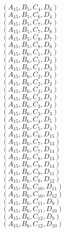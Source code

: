 \documentclass[14pt]{article}
\begin{document}
    $({A}_{15}, {B}_{5}, {C}_{4}, {D}_{6}) $ \\ 
    $({A}_{15}, {B}_{5}, {C}_{6}, {D}_{4}) $ \\ 
    $({A}_{15}, {B}_{5}, {C}_{7}, {D}_{7}) $ \\ 
    $({A}_{15}, {B}_{5}, {C}_{7}, {D}_{8}) $ \\ 
    $({A}_{15}, {B}_{5}, {C}_{8}, {D}_{7}) $ \\ 
    $({A}_{15}, {B}_{5}, {C}_{8}, {D}_{8}) $ \\ 
    $({A}_{15}, {B}_{6}, {C}_{1}, {D}_{1}) $ \\ 
    $({A}_{15}, {B}_{6}, {C}_{1}, {D}_{2}) $ \\ 
    $({A}_{15}, {B}_{6}, {C}_{1}, {D}_{3}) $ \\ 
    $({A}_{15}, {B}_{6}, {C}_{2}, {D}_{1}) $ \\ 
    $({A}_{15}, {B}_{6}, {C}_{2}, {D}_{2}) $ \\ 
    $({A}_{15}, {B}_{6}, {C}_{2}, {D}_{3}) $ \\ 
    $({A}_{15}, {B}_{6}, {C}_{3}, {D}_{1}) $ \\ 
    $({A}_{15}, {B}_{6}, {C}_{3}, {D}_{2}) $ \\ 
    $({A}_{15}, {B}_{6}, {C}_{3}, {D}_{3}) $ \\ 
    $({A}_{15}, {B}_{6}, {C}_{4}, {D}_{5}) $ \\ 
    $({A}_{15}, {B}_{6}, {C}_{5}, {D}_{4}) $ \\ 
    $({A}_{15}, {B}_{6}, {C}_{6}, {D}_{15}) $ \\ 
    $({A}_{15}, {B}_{6}, {C}_{7}, {D}_{13}) $ \\ 
    $({A}_{15}, {B}_{6}, {C}_{7}, {D}_{14}) $ \\ 
    $({A}_{15}, {B}_{6}, {C}_{8}, {D}_{13}) $ \\ 
    $({A}_{15}, {B}_{6}, {C}_{8}, {D}_{14}) $ \\ 
    $({A}_{15}, {B}_{6}, {C}_{9}, {D}_{11}) $ \\ 
    $({A}_{15}, {B}_{6}, {C}_{9}, {D}_{12}) $ \\ 
    $({A}_{15}, {B}_{6}, {C}_{10}, {D}_{11}) $ \\ 
    $({A}_{15}, {B}_{6}, {C}_{10}, {D}_{12}) $ \\ 
    $({A}_{15}, {B}_{6}, {C}_{11}, {D}_{9}) $ \\ 
    $({A}_{15}, {B}_{6}, {C}_{11}, {D}_{10}) $ \\ 
    $({A}_{15}, {B}_{6}, {C}_{12}, {D}_{9}) $ \\ 
    $({A}_{15}, {B}_{6}, {C}_{12}, {D}_{10}) $ \\ 
\end{document}
